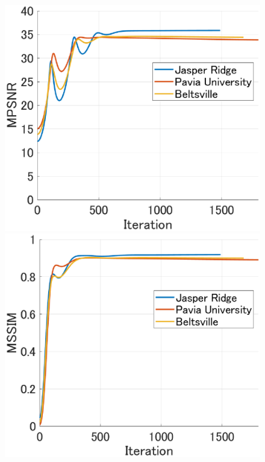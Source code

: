 \begin{figure}[t]
\begin{center}
\begin{minipage}{0.240\hsize}
        \end{minipage}
        \begin{minipage}{0.240\hsize}
            \centerline{\includegraphics[width=\hsize]{./fig_Conv_Anal/MPSNR.eps}}
        \end{minipage}
        \begin{minipage}{0.240\hsize}
            \centerline{\includegraphics[width=\hsize]{./fig_Conv_Anal/MSSIM.eps}}
        \end{minipage}


\end{center}
\end{figure}
